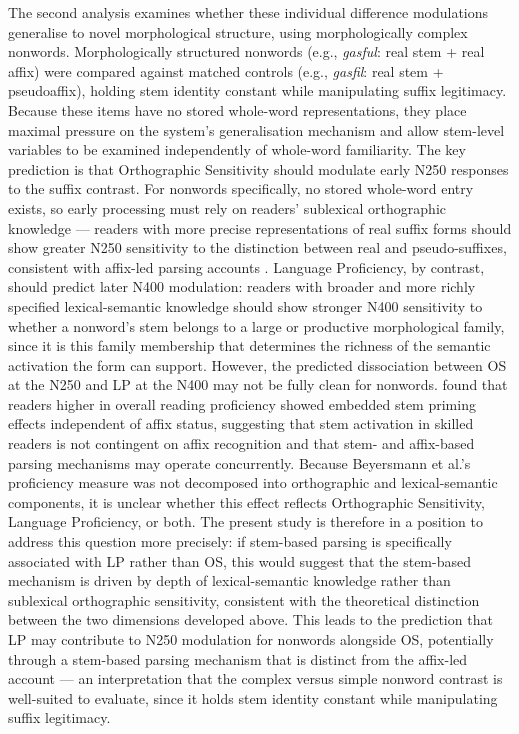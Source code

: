 \documentclass[utf8]{FrontiersinHarvard} %
\begin{document}
	The second analysis examines whether these individual difference modulations generalise to novel morphological structure, using morphologically complex nonwords. Morphologically structured nonwords (e.g., \textit{gasful}: real stem + real affix) were compared against matched controls (e.g., \textit{gasfil}: real stem + pseudoaffix), holding stem identity constant while manipulating suffix legitimacy. Because these items have no stored whole-word representations, they place maximal pressure on the system's generalisation mechanism and allow stem-level variables to be examined independently of whole-word familiarity. The key prediction is that Orthographic Sensitivity should modulate early N250 responses to the suffix contrast. For nonwords specifically, no stored whole-word entry exists, so early processing must rely on readers' sublexical orthographic knowledge --- readers with more precise representations of real suffix forms should show greater N250 sensitivity to the distinction between real and pseudo-suffixes, consistent with affix-led parsing accounts \citep{taft_lexical_1975, rastleMorphologicalDecompositionBased2008}. Language Proficiency, by contrast, should predict later N400 modulation: readers with broader and more richly specified lexical-semantic knowledge should show stronger N400 sensitivity to whether a nonword's stem belongs to a large or productive morphological family, since it is this family membership that determines the richness of the semantic activation the form can support. However, the predicted dissociation between OS at the N250 and LP at the N400 may not be fully clean for nonwords. \citet{beyersmannEmbeddedStemPriming2016} found that readers higher in overall reading proficiency showed embedded stem priming effects independent of affix status, suggesting that stem activation in skilled readers is not contingent on affix recognition and that stem- and affix-based parsing mechanisms may operate concurrently. Because Beyersmann et al.'s proficiency measure was not decomposed into orthographic and lexical-semantic components, it is unclear whether this effect reflects Orthographic Sensitivity, Language Proficiency, or both. The present study is therefore in a position to address this question more precisely: if stem-based parsing is specifically associated with LP rather than OS, this would suggest that the stem-based mechanism is driven by depth of lexical-semantic knowledge rather than sublexical orthographic sensitivity, consistent with the theoretical distinction between the two dimensions developed above. This leads to the prediction that LP may contribute to N250 modulation for nonwords alongside OS, potentially through a stem-based parsing mechanism that is distinct from the affix-led account --- an interpretation that the complex versus simple nonword contrast is well-suited to evaluate, since it holds stem identity constant while manipulating suffix legitimacy.
	
\end{document}
